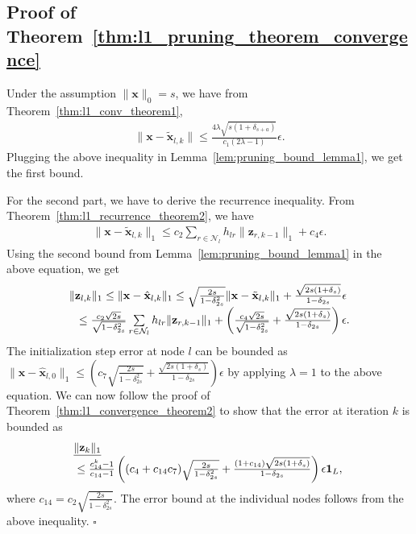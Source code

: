 \documentclass[journal]{IEEEtran}
\newcommand{\mbx}{\mathbf{x}}
\newcommand{\mbz}{\mathbf{z}}
\newcommand*{\QEDB}{\hfill\ensuremath{\square}}%
\begin{document}
\subsection{Proof of Theorem~\ref{thm:l1_pruning_theorem_convergence}}
Under the assumption $\|\mbx\|_0 = s$, we have from Theorem~\ref{thm:l1_conv_theorem1},
\begin{eqnarray*}
\|\mbx-\tilde{\mbx}_{l,k}\| \leq \frac{4\lambda \sqrt{s(1+\delta_{s+a})}}{c_1(2\lambda -1)}\epsilon .
\end{eqnarray*}
Plugging the above inequality in Lemma~\ref{lem:pruning_bound_lemma1}, we get the first bound.

For the second part, we have to derive the recurrence inequality. From Theorem~\ref{thm:l1_recurrence_theorem2}, we have
\begin{eqnarray*}
\|\mbx-\tilde{\mbx}_{l,k}\|_1 \leq c_2 \sum\limits_{r \in \mathcal{N}_l} h_{lr} \|\mbz_{r,k-1}\|_1 + c_4 \epsilon.
\end{eqnarray*}
Using the second bound from Lemma~\ref{lem:pruning_bound_lemma1} in the above equation, we get
\begin{eqnarray*}
\begin{array}{l}
\|\mbz_{l,k}\|_1  \leq \|\mbx-\hat{\mbx}_{l,k}\|_1 \leq \sqrt{\frac{2s}{1-\delta_{2s}^2}}\|\mbx-\tilde{\mbx}_{l,k}\|_1 + \frac{\sqrt{2s(1+\delta_{s})}}{1-\delta_{2s}}\epsilon \\
 \hspace{3mm} \leq \frac{c_{2}\sqrt{2s}}{\sqrt{1-\delta_{2s}^2}}\sum\limits_{r \in \mathcal{N}_l} h_{lr} \|\mbz_{r,k-1}\|_1 + \left(\frac{c_{4}\sqrt{2s}}{\sqrt{1-\delta_{2s}^2}} + \frac{\sqrt{2s(1+\delta_{s})}}{1-\delta_{2s}}\right)\epsilon.
\end{array}
\end{eqnarray*}
The initialization step error at node $l$ can be bounded as $\|\mbx-\hat{\mbx}_{l,0}\|_1 \leq \left(c_{7} \sqrt{\frac{2s}{1-\delta_{2s}^2}} + \frac{\sqrt{2s(1+\delta_{s})}}{1-\delta_{2s}}\right) \epsilon$ by applying $\lambda = 1$ to the above equation.
We can now follow the proof of Theorem~\ref{thm:l1_convergence_theorem2} to show that the error at iteration $k$ is bounded as
\begin{eqnarray*}
\begin{array}{l}
\hspace{-1mm}\underline{\|\mbz_k\|_1} \\ \leq \frac{c_{14}^k-1}{c_{14}-1}\left((c_{4}+c_{14}c_{7}) \sqrt{\frac{2s}{1-\delta_{2s}^2}} + \frac{(1+c_{14})\sqrt{2s(1+\delta_{s})}}{1-\delta_{2s}}\right) \epsilon \mathbf{1}_L,
\end{array}
\end{eqnarray*}
where $c_{14} = c_2\sqrt{\frac{2s}{1-\delta_{2s}^2}}$. 
The error bound at the individual nodes follows from the above inequality.  \QEDB
\end{document}
